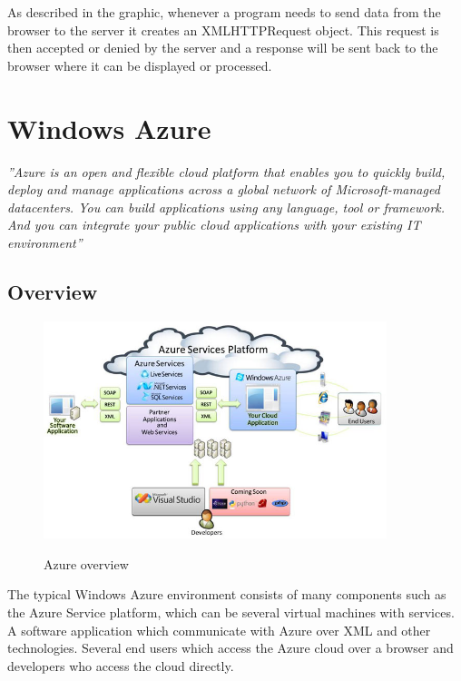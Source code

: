   As described in the graphic, whenever a program needs to send data from the browser to the server it creates an XMLHTTPRequest object. This request is then accepted or denied by the server and a response will be sent back to the browser where it can be displayed or processed. 
  
  \section{Windows Azure}
  \textit{''Azure is an open and flexible cloud platform that enables you to quickly build, deploy and manage applications across a global network of Microsoft-managed datacenters. You can build applications using any language, tool or framework. And you can integrate your public cloud applications with your existing IT environment''}\cite{azure}
  \subsection{Overview}
  \begin{figure}[htbp]
  \centering
  \includegraphics[width=100mm,height=\textheight,keepaspectratio]{graphics/azurePlattform.jpg}
  \caption{Azure overview}\cite{azureOver}
  \end{figure}
  
  The typical Windows Azure environment consists of many components such as the Azure Service platform, which can be several virtual machines with services. A software application which communicate with Azure over XML and other technologies. Several end users which access the Azure cloud over a browser and developers who access the cloud directly. 
  \newpage
